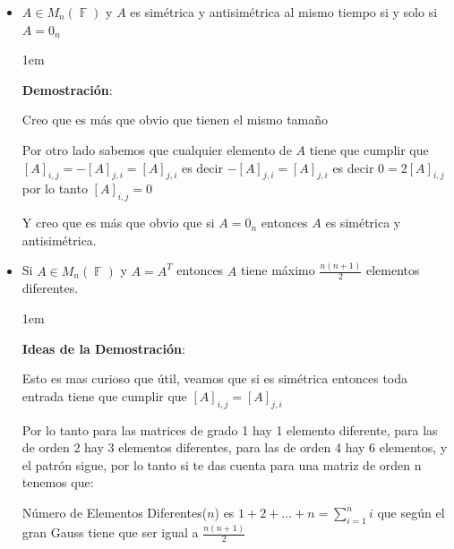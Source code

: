 \documentclass[12pt, fleqn]{report}                             %
\newenvironment{SmallIndentation}[1][0.75em]                    %
        {\begin{adjustwidth}{#1}{}\begin{footnotesize}}             %
        {\end{footnotesize}\end{adjustwidth}}                       %
\theoremstyle{break}                                            %
\DeclareMathOperator \GenericField {\mathbb{F}}                 %
\begin{document}
\begin{itemize}
\begin{SmallIndentation}[1em]
                            \end{SmallIndentation}


                        \item $A \in M_{n}(\GenericField)$ y $A$ es simétrica y antisimétrica al mismo tiempo
                            si y solo si $A = 0_n$

                            \begin{SmallIndentation}[1em]
                                \textbf{Demostración}:

                                Creo que es más que obvio que tienen el mismo tamaño

                                Por otro lado sabemos que cualquier elemento de $A$ tiene que cumplir
                                que $[A]_{i,j}=-[A]_{j,i} = [A]_{j,i}$ es decir $-[A]_{j,i} = [A]_{j,i}$
                                es decir $0 = 2[A]_{i,j}$ por lo tanto $[A]_{i,j} = 0$

                                Y creo que es más que obvio que si $A = 0_n$ entonces $A$ es simétrica y
                                antisimétrica.

                            \end{SmallIndentation}

                        \item Si $A \in M_{n}(\GenericField)$ y $A = A^T$ entonces $A$ tiene máximo 
                            $\frac{n(n+1)}{2}$ elementos diferentes.

                            \begin{SmallIndentation}[1em]
                                \textbf{Ideas de la Demostración}:

                                Esto es mas curioso que útil, veamos que si es simétrica entonces toda
                                entrada tiene que cumplir que $[A]_{i, j} = [A]_{j,i}$

                                Por lo tanto para las matrices de grado 1 hay 1 elemento diferente, 
                                para las de orden 2 hay 3 elementos diferentes, para las de orden 4 hay 6
                                elementos, y el patrón sigue, por lo tanto si te das cuenta para 
                                una matriz de orden n tenemos que:

                                Número de Elementos Diferentes($n$) es $1+2+\dots+n = \sum_{i=1}^{n} i$
                                que según el gran Gauss tiene que ser igual a $\frac{n(n+1)}{2}$

                            \end{SmallIndentation}


                    \end{itemize}
\end{document}
